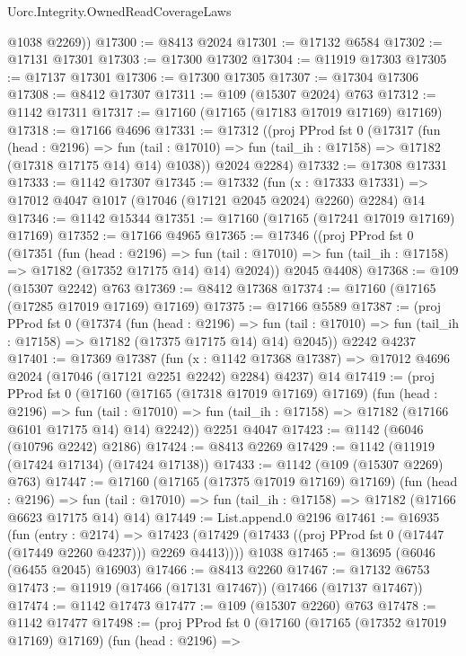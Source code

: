 \begin{lexlean}{Uorc.Integrity.OwnedReadCoverageLaws}
\begin{coremodule}
        @1038
        @2269))
@17300 := @8413 @2024
@17301 := @17132 @6584
@17302 := @17131 @17301
@17303 := @17300 @17302
@17304 := @11919 @17303
@17305 := @17137 @17301
@17306 := @17300 @17305
@17307 := @17304 @17306
@17308 := @8412 @17307
@17311 := @109 (@15307 @2024) @763
@17312 := @1142 @17311
@17317 := @17160 (@17165 (@17183 @17019 @17169) @17169)
@17318 := @17166 @4696
@17331 := @17312
    ((proj PProd fst 0
    (@17317
      (fun (head : @2196) =>
      fun (tail : @17010) => fun (tail_ih : @17158) => @17182 (@17318 @17175 @14) @14)
      @1038))
      @2024
      @2284)
@17332 := @17308 @17331
@17333 := @1142 @17307
@17345 := @17332
    (fun (x : @17333 @17331) => @17012 @4047 @1017 (@17046 (@17121 @2045 @2024) @2260) @2284)
    @14
@17346 := @1142 @15344
@17351 := @17160 (@17165 (@17241 @17019 @17169) @17169)
@17352 := @17166 @4965
@17365 := @17346
    ((proj PProd fst 0
    (@17351
      (fun (head : @2196) =>
      fun (tail : @17010) => fun (tail_ih : @17158) => @17182 (@17352 @17175 @14) @14)
      @2024))
      @2045
      @4408)
@17368 := @109 (@15307 @2242) @763
@17369 := @8412 @17368
@17374 := @17160 (@17165 (@17285 @17019 @17169) @17169)
@17375 := @17166 @5589
@17387 := (proj PProd fst 0
  (@17374
    (fun (head : @2196) =>
    fun (tail : @17010) => fun (tail_ih : @17158) => @17182 (@17375 @17175 @14) @14)
    @2045))
    @2242
    @4237
@17401 := @17369
    @17387
    (fun (x : @1142 @17368 @17387) => @17012 @4696 @2024 (@17046 (@17121 @2251 @2242) @2284) @4237)
    @14
@17419 := (proj PProd fst 0
  (@17160
    (@17165 (@17318 @17019 @17169) @17169)
    (fun (head : @2196) =>
    fun (tail : @17010) => fun (tail_ih : @17158) => @17182 (@17166 @6101 @17175 @14) @14)
    @2242))
    @2251
    @4047
@17423 := @1142 (@6046 (@10796 @2242) @2186)
@17424 := @8413 @2269
@17429 := @1142 (@11919 (@17424 @17134) (@17424 @17138))
@17433 := @1142 (@109 (@15307 @2269) @763)
@17447 := @17160
    (@17165 (@17375 @17019 @17169) @17169)
    (fun (head : @2196) =>
    fun (tail : @17010) => fun (tail_ih : @17158) => @17182 (@17166 @6623 @17175 @14) @14)
@17449 := List.append.{0} @2196
@17461 := @16935
    (fun (entry : @2174) =>
    @17423 (@17429 (@17433 ((proj PProd fst 0 (@17447 (@17449 @2260 @4237))) @2269 @4413))))
    @1038
@17465 := @13695 (@6046 (@6455 @2045) @16903)
@17466 := @8413 @2260
@17467 := @17132 @6753
@17473 := @11919 (@17466 (@17131 @17467)) (@17466 (@17137 @17467))
@17474 := @1142 @17473
@17477 := @109 (@15307 @2260) @763
@17478 := @1142 @17477
@17498 := (proj PProd fst 0
  (@17160
    (@17165 (@17352 @17019 @17169) @17169)
    (fun (head : @2196) =>

\end{coremodule}
\end{lexlean}
